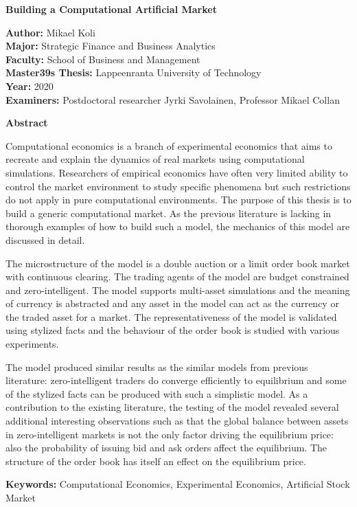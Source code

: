 \thispagestyle{plain}
\begin{center}
    \Large
    \textbf{Building a Computational Artificial Market}
        
    \vspace{0.4cm}
        
    \vspace{0.4cm}
    
    \begin{flushleft}
        \normalsize
        \textbf{Author:} Mikael Koli \\
        \textbf{Major:} Strategic Finance and Business Analytics \\
        \textbf{Faculty:} School of Business and Management \\
        \textbf{Master\char39s Thesis:} Lappeenranta University of Technology \\
        \textbf{Year:} 2020 \\
        \textbf{Examiners:} Postdoctoral researcher Jyrki Savolainen, Professor Mikael Collan
    \end{flushleft}
        
    \vspace{0.5cm}
    \textbf{Abstract}
\end{center}

Computational economics is a branch of experimental economics that aims to 
recreate and explain the dynamics of real markets using computational simulations. Researchers of
empirical economics have often very limited ability to control the market environment 
to study specific phenomena but such restrictions do not apply in pure computational
environments. The purpose of this thesis is to build a generic computational market. As the
previous literature is lacking in thorough examples of how to build such a model, the mechanics of this
model are discussed in detail. 

The microstructure of the model is a double auction or a limit order book market with continuous 
clearing. The trading agents of the model are budget constrained and zero-intelligent. 
The model supports multi-asset simulations and the meaning of currency is 
abstracted and any asset in the model can act as the currency or the traded asset for a market. 
The representativeness of the model is validated using stylized facts and the behaviour
of the order book is studied with various experiments.

The model produced similar results as the similar models from previous literature: zero-intelligent
traders do converge efficiently to equilibrium and some of the stylized facts can be produced
with such a simplistic model. As a contribution to the existing literature, the testing of the model 
revealed several additional interesting observations such as that the global balance between assets in 
zero-intelligent markets is not the only factor driving the equilibrium price: also the probability 
of issuing bid and ask orders affect the equilibrium. The structure of the order book has itself 
an effect on the equilibrium price.

\textbf{Keywords:} Computational Economics, Experimental Economics, Artificial Stock Market